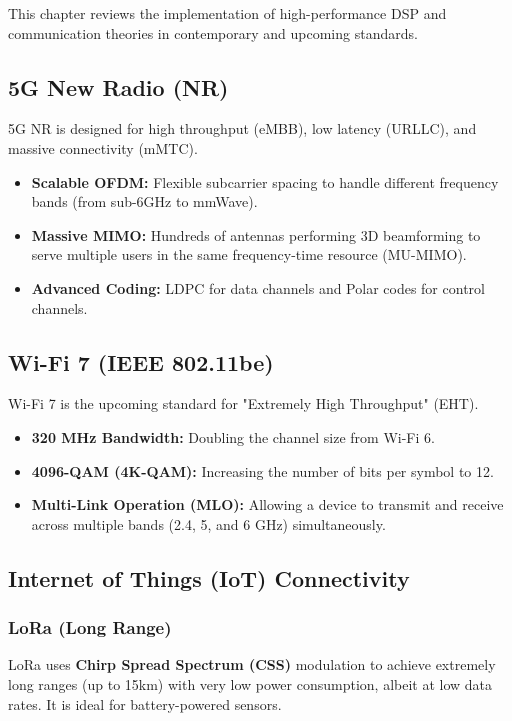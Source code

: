 
This chapter reviews the implementation of high-performance DSP and communication theories in contemporary and upcoming standards.

\subsection{5G New Radio (NR)}
5G NR is designed for high throughput (eMBB), low latency (URLLC), and massive connectivity (mMTC).
\begin{itemize}
    \item \textbf{Scalable OFDM:} Flexible subcarrier spacing to handle different frequency bands (from sub-6GHz to mmWave).
    \item \textbf{Massive MIMO:} Hundreds of antennas performing 3D beamforming to serve multiple users in the same frequency-time resource (MU-MIMO).
    \item \textbf{Advanced Coding:} LDPC for data channels and Polar codes for control channels.
\end{itemize}

\subsection{Wi-Fi 7 (IEEE 802.11be)}
Wi-Fi 7 is the upcoming standard for "Extremely High Throughput" (EHT).
\begin{itemize}
    \item \textbf{320 MHz Bandwidth:} Doubling the channel size from Wi-Fi 6.
    \item \textbf{4096-QAM (4K-QAM):} Increasing the number of bits per symbol to 12.
    \item \textbf{Multi-Link Operation (MLO):} Allowing a device to transmit and receive across multiple bands (2.4, 5, and 6 GHz) simultaneously.
\end{itemize}

\subsection{Internet of Things (IoT) Connectivity}
\subsubsection{LoRa (Long Range)}
LoRa uses \textbf{Chirp Spread Spectrum (CSS)} modulation to achieve extremely long ranges (up to 15km) with very low power consumption, albeit at low data rates. It is ideal for battery-powered sensors.

